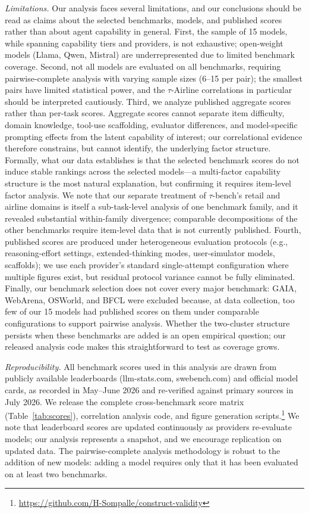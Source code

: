 \documentclass[sigconf]{acmart}
\begin{document}
\textit{Limitations.} Our analysis faces several limitations, and our conclusions should be read as claims about the selected benchmarks, models, and published scores rather than about agent capability in general. First, the sample of 15 models, while spanning capability tiers and providers, is not exhaustive; open-weight models (Llama, Qwen, Mistral) are underrepresented due to limited benchmark coverage. Second, not all models are evaluated on all benchmarks, requiring pairwise-complete analysis with varying sample sizes (6--15 per pair); the smallest pairs have limited statistical power, and the $\tau$-Airline correlations in particular should be interpreted cautiously. Third, we analyze published aggregate scores rather than per-task scores. Aggregate scores cannot separate item difficulty, domain knowledge, tool-use scaffolding, evaluator differences, and model-specific prompting effects from the latent capability of interest; our correlational evidence therefore constrains, but cannot identify, the underlying factor structure. Formally, what our data establishes is that the selected benchmark scores do not induce stable rankings across the selected models---a multi-factor capability structure is the most natural explanation, but confirming it requires item-level factor analysis. We note that our separate treatment of $\tau$-bench's retail and airline domains is itself a sub-task-level analysis of one benchmark family, and it revealed substantial within-family divergence; comparable decompositions of the other benchmarks require item-level data that is not currently published. Fourth, published scores are produced under heterogeneous evaluation protocols (e.g., reasoning-effort settings, extended-thinking modes, user-simulator models, scaffolds); we use each provider's standard single-attempt configuration where multiple figures exist, but residual protocol variance cannot be fully eliminated. Finally, our benchmark selection does not cover every major benchmark: GAIA, WebArena, OSWorld, and BFCL were excluded because, at data collection, too few of our 15 models had published scores on them under comparable configurations to support pairwise analysis. Whether the two-cluster structure persists when these benchmarks are added is an open empirical question; our released analysis code makes this straightforward to test as coverage grows.

{\sloppy
\textit{Reproducibility.} All benchmark scores used in this analysis are drawn from publicly available leaderboards (llm\hyp{}stats.com, swebench.com) and official model cards, as recorded in May--June 2026 and re-verified against primary sources in July 2026. We release the complete cross-benchmark score matrix (Table~\ref{tab:scores}), correlation analysis code, and figure generation scripts.\footnote{\url{https://github.com/H-Sompalle/construct-validity}} We note that leaderboard scores are updated continuously as providers re-evaluate models; our analysis represents a snapshot, and we encourage replication on updated data. The pairwise-complete analysis methodology is robust to the addition of new models: adding a model requires only that it has been evaluated on at least two benchmarks.\par}
\end{document}
